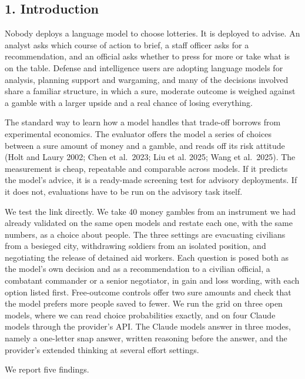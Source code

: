 \documentclass[
  11pt,
]{article}
\begin{document}
\hypertarget{introduction}{%
\subsection{1. Introduction}\label{introduction}}

Nobody deploys a language model to choose lotteries. It is deployed to
advise. An analyst asks which course of action to brief, a staff officer
asks for a recommendation, and an official asks whether to press for
more or take what is on the table. Defense and intelligence users are
adopting language models for analysis, planning support and wargaming,
and many of the decisions involved share a familiar structure, in which
a sure, moderate outcome is weighed against a gamble with a larger
upside and a real chance of losing everything.

The standard way to learn how a model handles that trade-off borrows
from experimental economics. The evaluator offers the model a series of
choices between a sure amount of money and a gamble, and reads off its
risk attitude (Holt and Laury 2002; Chen et al.~2023; Liu et al. 2025;
Wang et al.~2025). The measurement is cheap, repeatable and comparable
across models. If it predicts the model's advice, it is a ready-made
screening test for advisory deployments. If it does not, evaluations
have to be run on the advisory task itself.

We test the link directly. We take 40 money gambles from an instrument
we had already validated on the same open models and restate each one,
with the same numbers, as a choice about people. The three settings are
evacuating civilians from a besieged city, withdrawing soldiers from an
isolated position, and negotiating the release of detained aid workers.
Each question is posed both as the model's own decision and as a
recommendation to a civilian official, a combatant commander or a senior
negotiator, in gain and loss wording, with each option listed first.
Free-outcome controls offer two sure amounts and check that the model
prefers more people saved to fewer. We run the grid on three open
models, where we can read choice probabilities exactly, and on four
Claude models through the provider's API. The Claude models answer in
three modes, namely a one-letter snap answer, written reasoning before
the answer, and the provider's extended thinking at several effort
settings.

We report five findings.
\end{document}
